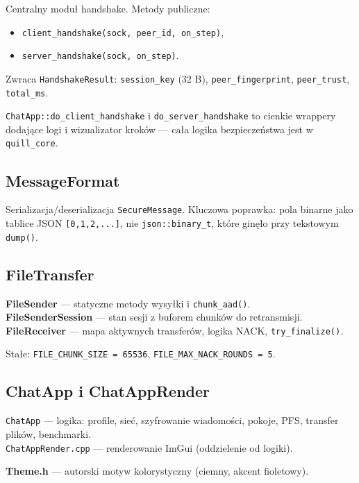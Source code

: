 \documentclass[12pt,a4paper]{article}
\begin{document}
Centralny moduł handshake. Metody publiczne:
\begin{itemize}
    \item \texttt{client\_handshake(sock, peer\_id, on\_step)},
    \item \texttt{server\_handshake(sock, on\_step)}.
\end{itemize}

Zwraca \texttt{HandshakeResult}: \texttt{session\_key} (32 B), \texttt{peer\_fingerprint}, \texttt{peer\_trust}, \texttt{total\_ms}.

\texttt{ChatApp::do\_client\_handshake} i \texttt{do\_server\_handshake} to cienkie wrappery dodające logi i wizualizator kroków --- cała logika bezpieczeństwa jest w \texttt{quill\_core}.

\subsection{MessageFormat}

Serializacja/deserializacja \texttt{SecureMessage}. Kluczowa poprawka: pola binarne jako tablice JSON \texttt{[0,1,2,...]}, nie \texttt{json::binary\_t}, które ginęło przy tekstowym \texttt{dump()}.

\subsection{FileTransfer}

\textbf{FileSender} --- statyczne metody wysyłki i \texttt{chunk\_aad()}.\\
\textbf{FileSenderSession} --- stan sesji z buforem chunków do retransmisji.\\
\textbf{FileReceiver} --- mapa aktywnych transferów, logika NACK, \texttt{try\_finalize()}.

Stałe: \texttt{FILE\_CHUNK\_SIZE = 65536}, \texttt{FILE\_MAX\_NACK\_ROUNDS = 5}.

\subsection{ChatApp i ChatAppRender}

\texttt{ChatApp} --- logika: profile, sieć, szyfrowanie wiadomości, pokoje, PFS, transfer plików, benchmarki.\\
\texttt{ChatAppRender.cpp} --- renderowanie ImGui (oddzielenie od logiki).

\textbf{Theme.h} --- autorski motyw kolorystyczny (ciemny, akcent fioletowy).
\end{document}
